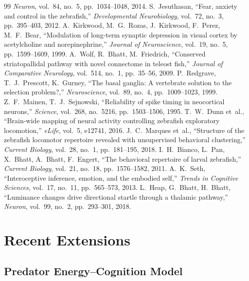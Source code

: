 \documentclass[11pt,a4paper]{article}
\begin{document}
\begin{thebibliography}{99}
  \textit{Neuron}, vol.~84, no.~5, pp.~1034--1048, 2014.
  S.~Jesuthasan,
  ``Fear, anxiety and control in the zebrafish,''
  \textit{Developmental Neurobiology}, vol.~72, no.~3, pp.~395--403, 2012.
  A.~Kirkwood, M.~G.~Rozas, J.~Kirkwood, F.~Perez, M.~F.~Bear,
  ``Modulation of long-term synaptic depression in visual cortex by acetylcholine and norepinephrine,''
  \textit{Journal of Neuroscience}, vol.~19, no.~5, pp.~1599--1609, 1999.
  A.~Wolf, R.~Bhatt, M.~Friedrich,
  ``Conserved striatopallidal pathway with novel connectome in teleost fish,''
  \textit{Journal of Comparative Neurology}, vol.~514, no.~1, pp.~35--56, 2009.
  P.~Redgrave, T.~J.~Prescott, K.~Gurney,
  ``The basal ganglia: A vertebrate solution to the selection problem?,''
  \textit{Neuroscience}, vol.~89, no.~4, pp.~1009--1023, 1999.
  Z.~F.~Mainen, T.~J.~Sejnowski,
  ``Reliability of spike timing in neocortical neurons,''
  \textit{Science}, vol.~268, no.~5216, pp.~1503--1506, 1995.
  T.~W.~Dunn et~al.,
  ``Brain-wide mapping of neural activity controlling zebrafish exploratory locomotion,''
  \textit{eLife}, vol.~5, e12741, 2016.
  J.~C.~Marques et~al.,
  ``Structure of the zebrafish locomotor repertoire revealed with unsupervised behavioral clustering,''
  \textit{Current Biology}, vol.~28, no.~1, pp.~181--195, 2018.
  I.~H.~Bianco, L.~Pan, X.~Bhatt, A.~Bhatt, F.~Engert,
  ``The behavioral repertoire of larval zebrafish,''
  \textit{Current Biology}, vol.~21, no.~18, pp.~1576--1582, 2011.
  A.~K.~Seth,
  ``Interoceptive inference, emotion, and the embodied self,''
  \textit{Trends in Cognitive Sciences}, vol.~17, no.~11, pp.~565--573, 2013.
  L.~Heap, G.~Bhatt, H.~Bhatt,
  ``Luminance changes drive directional startle through a thalamic pathway,''
  \textit{Neuron}, vol.~99, no.~2, pp.~293--301, 2018.
\end{thebibliography}

\appendix
\section{Recent Extensions}

\subsection{Predator Energy--Cognition Model}
\end{document}
